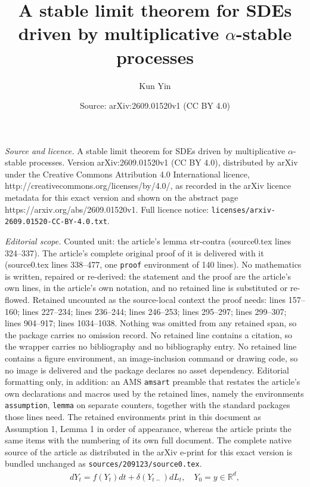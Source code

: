\documentclass[10pt,a4paper]{amsart}
\title{A stable limit theorem for SDEs driven by multiplicative $\alpha$-stable processes}
\author{Kun Yin}
\date{Source: arXiv:2609.01520v1 (CC BY 4.0)}
\begin{document}
\maketitle

\noindent\emph{Source and licence.} A stable limit theorem for SDEs driven by multiplicative $\alpha$-stable processes. Version arXiv:2609.01520v1 (CC BY 4.0), distributed by arXiv under the Creative Commons Attribution 4.0 International licence, http://creativecommons.org/licenses/by/4.0/, as recorded in the arXiv licence metadata for this exact version and shown on the abstract page https://arxiv.org/abs/2609.01520v1. Full licence notice: \texttt{licenses/arxiv-2609.01520-CC-BY-4.0.txt}.\par\smallskip

\noindent\textit{Editorial scope.} Counted unit: the article's lemma str-contra (source0.tex lines 324--337). The article's complete original proof of it is delivered with it (source0.tex lines 338--477, one \texttt{proof} environment of 140 lines). No mathematics is written, repaired or re-derived: the statement and the proof are the article's own lines, in the article's own notation, and no retained line is substituted or re-flowed.  Retained uncounted as the source-local context the proof needs: lines 157--160; lines 227--234; lines 236--244; lines 246--253; lines 295--297; lines 299--307; lines 904--917; lines 1034--1038.  Nothing was omitted from any retained span, so the package carries no omission record.  No retained line contains a citation, so the wrapper carries no bibliography and no bibliography entry.  No retained line contains a figure environment, an image-inclusion command or drawing code, so no image is delivered and the package declares no asset dependency.  Editorial formatting only, in addition: an AMS \texttt{amsart} preamble that restates the article's own declarations and macros used by the retained lines, namely the environments \texttt{assumption}, \texttt{lemma} on separate counters, together with the standard packages those lines need.  The retained environments print in this document as Assumption 1, Lemma 1 in order of appearance, whereas the article prints the same items with the numbering of its own full document.  The complete native source of the article as distributed in the arXiv e-print for this exact version is bundled unchanged as \texttt{sources/209123/source0.tex}.
\begin{align}\label{multca}
	dY_{t}=f(Y_{t})dt+\delta(Y_{t-})dL_{t},\quad
	Y_{0}=y\in \mathbb{R}^{d },
\end{align}	
\end{document}
